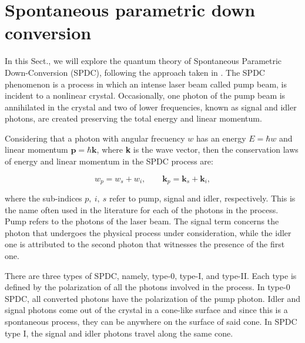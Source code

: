 \documentclass[12pt]{book}
\begin{document}
\section{Spontaneous parametric down conversion}



In this Sect., we will explore the quantum theory of Spontaneous Parametric Down-Conversion (SPDC), following the approach taken in \cite{procopio,multiphoton}. The SPDC phenomenon is a process in which an intense laser beam called pump beam, is incident to a nonlinear crystal. Occasionally, one photon of the pump beam is annihilated in the crystal and two of lower frequencies, known as signal and idler photons, are created preserving the total energy and linear momentum.

Considering that a photon with angular frecuency $w$ has an energy $E=\hbar w$ and linear momentum $\mathbf{p} = \hbar \mathbf{k}$, where \textbf{k} is the wave vector, then the conservation laws of energy and linear momentum in the SPDC process are: 


\begin{equation}
w_{p}=w_{s}+w_{i}, \qquad \mathbf{k}_{p}=\mathbf{k}_{s}+\mathbf{k}_{i}, \label{conservation}
\end{equation}

where the sub-indices $p,~i,~s$ refer to pump, signal and idler, respectively. This is the name often used in the literature for each of the photons in the process. Pump refers to the photons of the laser beam. The signal term concerns the photon that undergoes the physical process under consideration, while the idler one is attributed to the second photon that witnesses the presence of the first one.

There are three types of SPDC, namely, type-0, type-I, and type-II. Each type is defined by the polarization of all the photons involved in the process. In type-0 SPDC, all converted photons have the polarization of the pump photon. Idler and signal photons come out of the crystal in a cone-like surface and since this is a spontaneous process, they can be anywhere on the surface of said cone. In SPDC type I, the signal and idler photons travel along the same cone.
\end{document}
